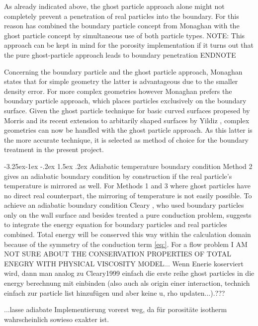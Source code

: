 \documentclass{report}
\makeatletter
\renewcommand\paragraph{\@startsection{paragraph}{4}{\z@}%
  {-3.25ex\@plus -1ex \@minus -.2ex}%
  {1.5ex \@plus .2ex}%
  {\normalfont\normalsize\bfseries}}
\makeatother
\begin{document}
As already indicated above, the ghost particle approach alone might not completely prevent a penetration of real particles into the boundary. For this reason \cite{Liu2002} has combined the boundary particle concept from Monaghan with the ghost particle concept by simultaneous use of both particle types.  NOTE: This approach can be kept in mind for the porosity implementation if it turns out that the pure ghost-particle approach leads to boundary penetration ENDNOTE

Concerning the boundary particle and the ghost particle approach, Monaghan \cite{Monaghan2005} states that for simple geometry the latter is advantageous due to the smaller density error. For more complex geometries however Monaghan prefers the boundary particle approach, which places particles exclusively on the boundary surface.
Given the ghost particle technique for basic curved surfaces propesed by Morris \cite{Morris1997, Zhu1999} and its recent extension to arbitarily shaped surfaces by Yildiz \cite{Yildiz2009}, complex geometries can now be handled with the ghost particle approach. As this latter is the more accurate technique, it is selected as method of choice for the boundary treatment in the present project.



\paragraph{Adiabatic temperature boundary condition}
Method 2 gives an adiabatic boundary condition by construction if the real particle's temperature is mirrored as well. 
For Methods 1 and 3 where ghost particles have no direct real counterpart, the mirroring of temperature is not easily possible. To achieve an adiabatic boundary condition Cleary \cite{Cleary1999}, who used boundary particles only on the wall surface and besides treated a pure conduction problem, suggests to integrate the energy equation for boundary particles and real particles combined. Total energy will be conserved this way within the calculation domain because of the symmetry of the conduction term \ref{eq:}.
For a flow problem I AM NOT SURE ABOUT THE CONSERVATION PROPERTIES OF TOTAL ENEGRY WITH PHYSICAL VISCOSITY MODEL...
Wenn Enerie koserviert wird, dann man analog zu Cleary1999 einfach die erste reihe ghost particles in die energy berechnung mit einbinden (also auch als origin einer interaction, technich einfach zur particle list hinzufügen und aber keine u, rho updaten...).???

...lasse adiabate Implementierung vorerst weg, da für porositäte isotherm wahrscheinlich sowieso exakter ist.
\end{document}
